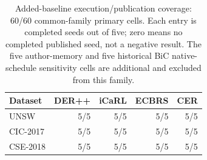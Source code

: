 \begin{table}[htbp]\centering\small
\caption{Added-baseline execution/publication coverage: 60/60 common-family primary cells. Each entry is completed seeds out of five; zero means no completed published seed, not a negative result. The five author-memory and five historical BiC native-schedule sensitivity cells are additional and excluded from this family.}
\label{tab:published-baselines-coverage}
\begin{tabular}{lrrrr}\toprule
Dataset & DER++ & iCaRL & ECBRS & CER\\\midrule
UNSW & 5/5 & 5/5 & 5/5 & 5/5\\
CIC-2017 & 5/5 & 5/5 & 5/5 & 5/5\\
CSE-2018 & 5/5 & 5/5 & 5/5 & 5/5\\
\bottomrule\end{tabular}\end{table}
